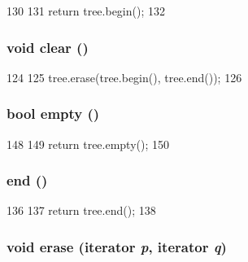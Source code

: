 \begin{DoxyCode}
130     {
131         return tree.begin();
132     }
\end{DoxyCode}
\hypertarget{classSparcISA_1_1TlbMap_ac8bb3912a3ce86b15842e79d0b421204}{
\subsubsection[{clear}]{\setlength{\rightskip}{0pt plus 5cm}void clear ()}}
\label{classSparcISA_1_1TlbMap_ac8bb3912a3ce86b15842e79d0b421204}



\begin{DoxyCode}
124     {
125         tree.erase(tree.begin(), tree.end());
126     }
\end{DoxyCode}
\hypertarget{classSparcISA_1_1TlbMap_a3f37b042a1e7cd4bd38fc564de81f0da}{
\subsubsection[{empty}]{\setlength{\rightskip}{0pt plus 5cm}bool empty ()}}
\label{classSparcISA_1_1TlbMap_a3f37b042a1e7cd4bd38fc564de81f0da}



\begin{DoxyCode}
148     {
149         return tree.empty();
150     }
\end{DoxyCode}
\hypertarget{classSparcISA_1_1TlbMap_acad38d52497a975bfb6f2f6acd76631f}{
\subsubsection[{end}]{ end ()}}
\label{classSparcISA_1_1TlbMap_acad38d52497a975bfb6f2f6acd76631f}



\begin{DoxyCode}
136     {
137         return tree.end();
138     }
\end{DoxyCode}
\hypertarget{classSparcISA_1_1TlbMap_a8645d9bde1addc5c75d4076d0f016a98}{
\subsubsection[{erase}]{\setlength{\rightskip}{0pt plus 5cm}void erase ({\bf iterator} {\em p}, \/  {\bf iterator} {\em q})}}
\label{classSparcISA_1_1TlbMap_a8645d9bde1addc5c75d4076d0f016a98}



